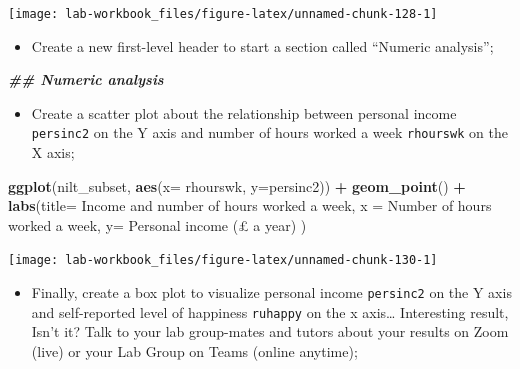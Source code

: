 \documentclass[
]{book}
\newenvironment{Shaded}{\begin{snugshade}}{\end{snugshade}}
\newcommand{\AttributeTok}[1]{\textcolor[rgb]{0.13,0.29,0.53}{#1}}
\newcommand{\DocumentationTok}[1]{\textcolor[rgb]{0.56,0.35,0.01}{\textbf{\textit{#1}}}}
\newcommand{\FunctionTok}[1]{\textcolor[rgb]{0.13,0.29,0.53}{\textbf{#1}}}
\newcommand{\NormalTok}[1]{#1}
\newcommand{\SpecialCharTok}[1]{\textcolor[rgb]{0.81,0.36,0.00}{\textbf{#1}}}
\newcommand{\StringTok}[1]{\textcolor[rgb]{0.31,0.60,0.02}{#1}}
\providecommand{\tightlist}{%
  \setlength{\itemsep}{0pt}\setlength{\parskip}{0pt}}
\begin{document}
\begin{flushleft}\texttt{[image: lab-workbook\_files/figure-latex/unnamed-chunk-128-1]} \end{flushleft}

\begin{itemize}
\tightlist
\item
  Create a new first-level header to start a section called ``Numeric analysis'';
\end{itemize}

\begin{Shaded}
\begin{Highlighting}[]
\DocumentationTok{\#\# Numeric analysis}
\end{Highlighting}
\end{Shaded}

\begin{itemize}
\tightlist
\item
  Create a scatter plot about the relationship between personal income \texttt{persinc2} on the Y axis and number of hours worked a week \texttt{rhourswk} on the X axis;
\end{itemize}

\begin{Shaded}
\begin{Highlighting}[]
\FunctionTok{ggplot}\NormalTok{(nilt\_subset, }\FunctionTok{aes}\NormalTok{(}\AttributeTok{x=}\NormalTok{ rhourswk, }\AttributeTok{y=}\NormalTok{persinc2)) }\SpecialCharTok{+}
  \FunctionTok{geom\_point}\NormalTok{() }\SpecialCharTok{+}
  \FunctionTok{labs}\NormalTok{(}\AttributeTok{title=} \StringTok{\textquotesingle{}Income and number of hours worked a week\textquotesingle{}}\NormalTok{,}
       \AttributeTok{x =} \StringTok{\textquotesingle{}Number of hours worked a week\textquotesingle{}}\NormalTok{, }\AttributeTok{y=} \StringTok{\textquotesingle{}Personal income (£ a year)\textquotesingle{}}\NormalTok{ )}
\end{Highlighting}
\end{Shaded}

\begin{flushleft}\texttt{[image: lab-workbook\_files/figure-latex/unnamed-chunk-130-1]} \end{flushleft}

\begin{itemize}
\tightlist
\item
  Finally, create a box plot to visualize personal income \texttt{persinc2} on the Y axis and self-reported level of happiness \texttt{ruhappy} on the x axis\ldots{} Interesting result, Isn't it? Talk to your lab group-mates and tutors about your results on Zoom (live) or your Lab Group on Teams (online anytime);
\end{itemize}
\end{document}
